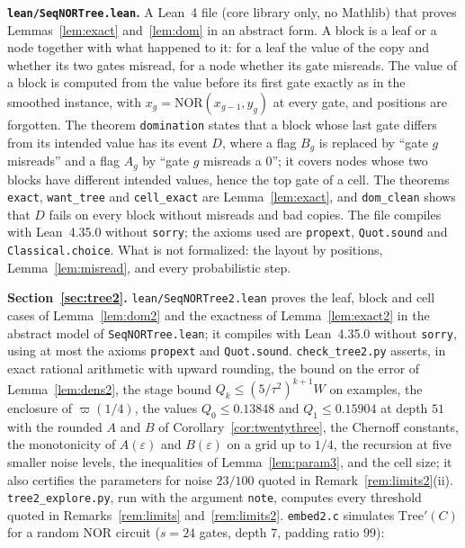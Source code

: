 \documentclass[11pt]{amsart}
\theoremstyle{definition}
\theoremstyle{remark}
\newcommand{\eps}{\varepsilon}
\newcommand{\NOR}{\mathrm{NOR}}
\begin{document}
\medskip\noindent\textbf{\texttt{lean/SeqNORTree.lean}.} A Lean~4 file (core library only, no
Mathlib) that proves Lemmas~\ref{lem:exact} and~\ref{lem:dom} in an abstract form. A block is a
leaf or a node together with what happened to it: for a leaf the value of the copy and whether its
two gates misread, for a node whether its gate misreads. The value of a block is computed from the
value before its first gate exactly as in the smoothed instance, with
$x_g=\NOR(x_{g-1},y_g)$ at every gate, and positions are forgotten. The theorem
\texttt{domination} states that a block whose last gate differs from its intended value has its
event $D$, where a flag $B_g$ is replaced by ``gate $g$ misreads'' and a flag $A_g$ by ``gate $g$
misreads a $0$''; it covers nodes whose two blocks have different intended values, hence the top
gate of a cell. The theorems \texttt{exact}, \texttt{want\_tree} and \texttt{cell\_exact} are
Lemma~\ref{lem:exact}, and \texttt{dom\_clean} shows that $D$ fails on every block without
misreads and bad copies. The file compiles with Lean~4.35.0 without \texttt{sorry}; the axioms
used are \texttt{propext}, \texttt{Quot.sound} and \texttt{Classical.choice}. What is not
formalized: the layout by positions, Lemma~\ref{lem:misread}, and every probabilistic step.

\medskip\noindent\textbf{Section~\ref{sec:tree2}.} \texttt{lean/SeqNORTree2.lean} proves the leaf,
block and cell cases of Lemma~\ref{lem:dom2} and the exactness of Lemma~\ref{lem:exact2} in the
abstract model of \texttt{SeqNORTree.lean}; it compiles with Lean~4.35.0 without \texttt{sorry},
using at most the axioms \texttt{propext} and \texttt{Quot.sound}. \texttt{check\_tree2.py} asserts,
in exact rational arithmetic with upward rounding, the bound on the error of
Lemma~\ref{lem:dens2}, the stage bound $Q_k\le(5/\tau^2)^{k+1}W$ on examples, the enclosure of
$\varpi(1/4)$, the values $Q_0\le0.13848$ and $Q_1\le0.15904$ at depth $51$ with the rounded $A$ and
$B$ of Corollary~\ref{cor:twentythree}, the Chernoff
constants, the monotonicity of $A(\eps)$ and $B(\eps)$ on a grid up to $1/4$, the recursion at five
smaller noise levels, the inequalities of Lemma~\ref{lem:param3}, and the cell size; it also
certifies the parameters for noise $23/100$ quoted in Remark~\ref{rem:limits2}(ii). \texttt{tree2\_explore.py}, run with the argument \texttt{note}, computes every threshold quoted in
Remarks~\ref{rem:limits} and~\ref{rem:limits2}. \texttt{embed2.c} simulates $\mathrm{Tree}'(C)$ for a random NOR
circuit ($s=24$ gates, depth $7$, padding ratio $99$):
\end{document}

